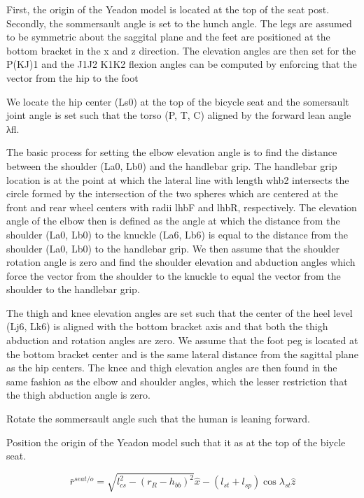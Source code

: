 \documentclass[10pt]{article}
\begin{document}
First, the origin of the Yeadon model is located at the top of the seat post.
Secondly, the sommersault angle is set to the hunch angle. The legs are assumed
to be symmetric about the saggital plane and the feet are positioned at the
bottom bracket in the x and z direction. The elevation angles are then set for
the P(KJ)1 and the J1J2 K1K2 flexion angles can be computed by enforcing that
the vector from the hip to the foot

We locate the hip center (Ls0) at the top of the bicycle seat and the
somersault joint angle is set such that the torso (P, T, C) aligned by the
forward lean angle λfl.

The basic process for setting the elbow elevation angle is to find the distance
between the shoulder (La0, Lb0) and the handlebar grip. The handlebar grip
location is at the point at which the lateral line with length whb2 intersects
the circle formed by the intersection of the two spheres which are centered at
the front and rear wheel centers with radii lhbF and lhbR, respectively. The
elevation angle of the elbow then is defined as the angle at which the distance
from the shoulder (La0, Lb0) to the knuckle (La6, Lb6) is equal to the distance
from the shoulder (La0, Lb0) to the handlebar grip. We then assume that the
shoulder rotation angle is zero and find the shoulder elevation and abduction
angles which force the vector from the shoulder to the knuckle to equal the
vector from the shoulder to the handlebar grip.

The thigh and knee elevation angles are set such that the center of the heel
level (Lj6, Lk6) is aligned with the bottom bracket axis and that both the
thigh abduction and rotation angles are zero. We assume that the foot peg is
located at the bottom bracket center and is the same lateral distance from the
sagittal plane as the hip centers. The knee and thigh elevation angles are then
found in the same fashion as the elbow and shoulder angles, which the lesser
restriction that the thigh abduction angle is zero.

Rotate the sommersault angle such that the human is leaning forward.

Position the origin of the Yeadon model such that it as at the top of the
biycle seat.

\begin{equation}
  \bar{r}^{seat/o} = \sqrt{l_{cs}^2 - (r_R - h_{bb})^2} \hat{x} - (l_{st} + l_{sp})
  \operatorname{cos}\lambda_{st} \hat{z}
\end{equation}
\end{document}
